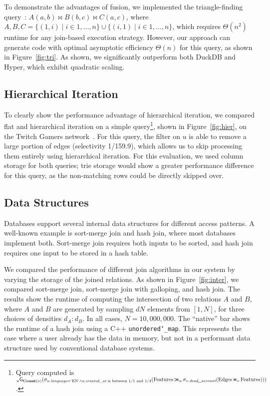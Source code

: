 \documentclass[acmsmall,screen,nonacm]{acmart}\settopmatter{printfolios=true,printccs=false,printacmref=false}
\newcommand*{\agg}{\mathsf{G}}
\newcommand*{\ojoinbars}{\rule[0.05ex]{.25em}{.6pt}\llap{\rule[1.0ex]{.25em}{.6pt}}}
\DeclareMathOperator*{\ljoin}{\ojoinbars\mkern-6.8mu\Join}
\DeclareMathOperator*{\ijoin}{\Join}
\begin{document}
To demonstrate the advantages of fusion, we implemented the
triangle-finding query~\cite{ngo-skew}:
$A(a,b) \ijoin B(b,c) \ijoin C(a,c)$,
where
$A, B, C = \{ (1, i) \mid i \in 1, \dots, n \} \cup \{ (i, 1) \mid i \in 1, \dots, n \}$,
which requires $\Theta(n^2)$ runtime for
any join-based execution strategy.
However, our approach can generate
code with optimal asymptotic efficiency $\Theta(n)$
for this query, as shown in Figure~\ref{fig:tri}.
As shown, we significantly outperform both DuckDB and Hyper,
which exhibit quadratic scaling.

\subsection{Hierarchical Iteration}
\label{sec:hierarchical}

To clearly show the performance advantage of hierarchical iteration,
we compared flat and hierarchical iteration on a simple query\footnote{
Query computed is \allowbreak
        $_{u}\agg_{\textbf{Count}(v)}(\allowbreak
            \sigma_{u.\textit{language} = \textrm{`EN'} \land
            u.\textit{created\char`_at} \textrm{ is between 1/1 and 1/4}}(\allowbreak
                \textrm{Features} \ljoin_u
                    \sigma_{v.\textit{dead\char`_account}}(\textrm{Edges} \ijoin_v \textrm{Features})
            ))$.
}, shown in
Figure~\ref{fig:hier}, on the Twitch Gamers network~\cite{rozemberczki2021twitch}.
For this query, the filter on $u$ is able to remove a large portion of edges
(selectivity 1/159.9), which allows us to skip processing them entirely
using hierarchical iteration. For this evaluation, we used column storage for
both queries; trie storage would show a greater performance difference for this
query, as the non-matching rows could be directly skipped over.

\subsection{Data Structures}
\label{sec:datastructures}

Databases support several internal data structures for different access patterns. A well-known example is sort-merge join and hash join, where most databases implement both. Sort-merge join requires both inputs to be sorted, and hash join requires one input to be stored in a hash table.

We compared the performance of different join algorithms in our system by varying the storage of the joined relations.
As shown in Figure~\ref{fig:inter}, we compared sort-merge join, sort-merge join with galloping, and hash join.
The results show the runtime of computing the intersection of two relations $A$ and $B$, where $A$ and $B$ are generated by sampling $d N$ elements from $[1, N]$, for three choices of densities $d_A:d_B$. In all cases, $N = 10{,}000{,}000$.
The ``native'' bar shows the runtime of a hash join using a C++ \texttt{unordered\char`_map}. This represents the case where a user already has the data in memory, but not in a performant data structure used by conventional database systems.
\end{document}
